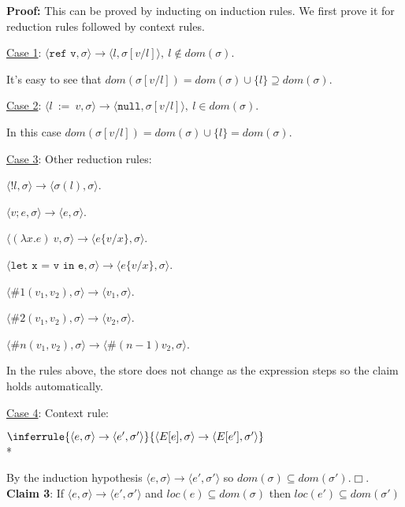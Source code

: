 \documentclass[10pt]{article}
\newcommand{\Rule}[3]{
    \label{rule:#1}
  \hfill
  \ensuremath{\inferrule{#2}{#3}}
  \hfill
}
\begin{document}
\begin{enumerate} [(a)]
    \textbf{Proof:} This can be proved by inducting on induction rules. We first prove it for reduction rules followed by context rules.

    \underline{Case 1}: $\langle \texttt{ref v}, \sigma \rangle \rightarrow \langle l, \sigma[v/l] \rangle,~l \notin dom(\sigma)$.

    It's easy to see that $dom(\sigma[v/l]) = dom(\sigma) \cup \{l\} \supseteq dom(\sigma)$.

    \underline{Case 2}: $\langle l~:=~v, \sigma \rangle \rightarrow \langle \texttt{null}, \sigma[v/l] \rangle,~l \in dom(\sigma)$.

    In this case $dom(\sigma[v/l]) = dom(\sigma) \cup \{l\} = dom(\sigma)$.

    \underline{Case 3}:  Other reduction rules:

    $\langle !l, \sigma \rangle \rightarrow \langle \sigma(l), \sigma\rangle$.
    
    $\langle v;e, \sigma \rangle \rightarrow \langle e, \sigma \rangle$.

    $\langle (\lambda x.e)~v, \sigma \rangle \rightarrow \langle e\{v/x\}, \sigma \rangle$.

    $\langle \texttt{let x = v in e}, \sigma \rangle \rightarrow \langle e\{v/x\}, \sigma \rangle$.

    $\langle \#1(v_1, v_2), \sigma \rangle \rightarrow \langle v_1, \sigma \rangle$.

    $\langle \#2(v_1, v_2), \sigma \rangle \rightarrow \langle v_2, \sigma \rangle$.

    $\langle \#n(v_1, v_2), \sigma \rangle \rightarrow \langle \#(n-1)v_2, \sigma \rangle$.

    In the rules above, the store does not change as the expression steps so the claim holds automatically.

    \underline{Case 4}: Context rule:

    \Rule{}{
    \langle e, \sigma \rangle \rightarrow \langle e', \sigma' \rangle
  }{
    \langle E[e], \sigma \rangle \rightarrow \langle E[e'], \sigma' \rangle
  } \\*

    By the induction hypothesis $\langle e, \sigma \rangle \rightarrow \langle e', \sigma' \rangle$ so $dom(\sigma) \subseteq dom(\sigma')$.$\Box$.\\

    \textbf{Claim 3}: If $\langle e, \sigma \rangle \rightarrow \langle e', \sigma' \rangle$ and $loc(e) \subseteq dom(\sigma)$ then $loc(e') \subseteq dom(\sigma')$


\end{enumerate}
\end{document}

